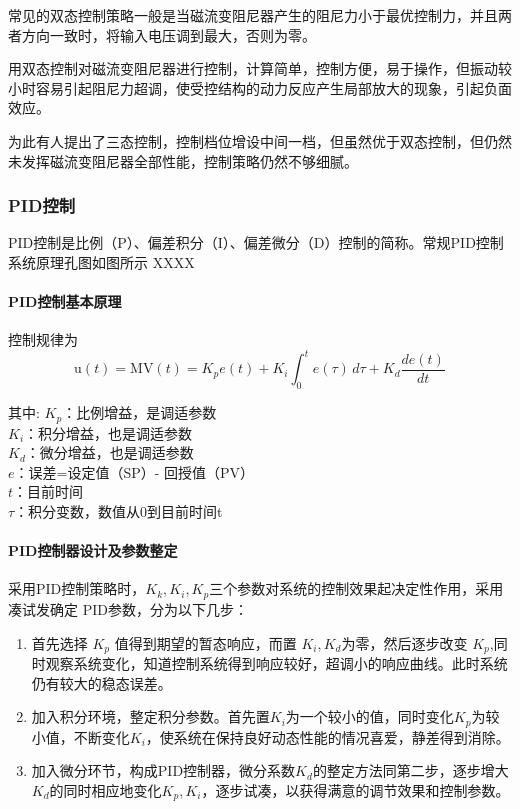 常见的双态控制策略一般是当磁流变阻尼器产生的阻尼力小于最优控制力，并且两者方向一致时，将输入电压调到最大，否则为零。

用双态控制对磁流变阻尼器进行控制，计算简单，控制方便，易于操作，但振动较小时容易引起阻尼力超调，使受控结构的动力反应产生局部放大的现象，引起负面效应。

为此有人提出了三态控制，控制档位增设中间一档，但虽然优于双态控制，但仍然未发挥磁流变阻尼器全部性能，控制策略仍然不够细腻。

\subsubsection{PID控制}

PID控制是比例（P）、偏差积分（I）、偏差微分（D）控制的简称。常规PID控制系统原理孔图如图所示 XXXX


\paragraph{PID控制基本原理}
\qquad 控制规律为
\[\mathrm{u}(t)=\mathrm{MV}(t)=K_p{e(t)} + K_{i}\int_{0}^{t}{e(\tau)}\,{d\tau} + K_{d}\frac{de(t)}{dt}\]

其中:
$K_p$：比例增益，是调适参数\\
$K_i$：积分增益，也是调适参数\\
$K_d$：微分增益，也是调适参数\\
$e$：误差=设定值（SP）- 回授值（PV）\\
$t$：目前时间\\
$\tau$：积分变数，数值从0到目前时间t

\paragraph{PID控制器设计及参数整定}
\qquad 采用PID控制策略时，$K_{k},K_{i},K_{p}$三个参数对系统的控制效果起决定性作用，采用凑试发确定 PID参数，分为以下几步：
\begin{enumerate}
\item 首先选择 $K_p$ 值得到期望的暂态响应，而置 $K_i,K_d$为零，然后逐步改变 $K_p$,同时观察系统变化，知道控制系统得到响应较好，超调小的响应曲线。此时系统仍有较大的稳态误差。
\item 加入积分环境，整定积分参数。首先置$K_i$为一个较小的值，同时变化$K_p$为较小值，不断变化$K_i$，使系统在保持良好动态性能的情况喜爱，静差得到消除。
\item 加入微分环节，构成PID控制器，微分系数$K_d$的整定方法同第二步，逐步增大$K_d$的同时相应地变化$K_p,K_i$，逐步试凑，以获得满意的调节效果和控制参数。
\end{enumerate}

